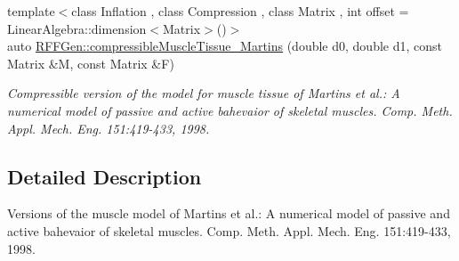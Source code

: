\begin{DoxyCompactItemize}
{\footnotesize template$<$class Inflation , class Compression , class Matrix , int offset = Linear\-Algebra\-::dimension$<$\-Matrix$>$()$>$ }\\auto \hyperlink{group__Biomechanics_ga3bd109a716f5eab7c263fa42cb66a937}{R\-F\-F\-Gen\-::compressible\-Muscle\-Tissue\-\_\-\-Martins} (double d0, double d1, const Matrix \&M, const Matrix \&F)
\begin{DoxyCompactList}\small\item\em Compressible version of the model for muscle tissue of Martins et al.\-: A numerical model of passive and active bahevaior of skeletal muscles. Comp. Meth. Appl. Mech. Eng. 151\-:419-\/433, 1998. \end{DoxyCompactList}\end{DoxyCompactItemize}


\subsection{Detailed Description}
Versions of the muscle model of Martins et al.\-: A numerical model of passive and active bahevaior of skeletal muscles. Comp. Meth. Appl. Mech. Eng. 151\-:419-\/433, 1998. 